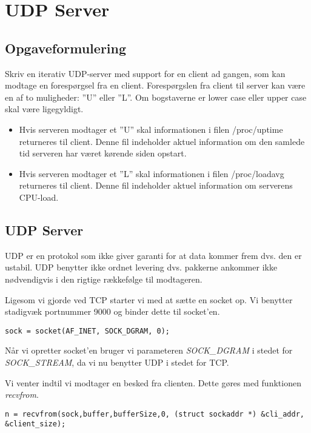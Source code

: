 \chapter{UDP Server}

\section{Opgaveformulering}

Skriv en iterativ UDP-server med support for en client ad gangen, som kan modtage en forespørgsel fra en client.
Forespørgslen fra client til server kan være en af to muligheder: ”U” eller ”L”. Om bogstaverne er lower case eller upper case skal være ligegyldigt.
\begin{itemize}
	\item Hvis serveren modtager et ”U” skal informationen i filen /proc/uptime
	returneres til client. Denne fil indeholder aktuel information om den samlede
	tid serveren har været kørende siden opstart.\\
	
	\item Hvis serveren modtager et ”L” skal informationen i filen /proc/loadavg
	returneres til client. Denne fil indeholder aktuel information om serverens
	CPU-load.
\end{itemize}

\section{UDP Server}
 
UDP er en protokol som ikke giver garanti for at data kommer frem dvs. den er ustabil. UDP benytter ikke ordnet levering dvs. pakkerne ankommer ikke nødvendigvis i den rigtige rækkefølge til modtageren. 

Ligesom vi gjorde ved TCP starter vi med at sætte en socket op. Vi benytter stadigvæk portnummer 9000 og binder dette til socket'en. 

\begin{lstlisting}
sock = socket(AF_INET, SOCK_DGRAM, 0);
\end{lstlisting}

Når vi opretter socket'en bruger vi parameteren \textit{SOCK\_DGRAM} i stedet for \textit{SOCK\_STREAM}, da vi nu benytter UDP i stedet for TCP. 

Vi venter indtil vi modtager en besked fra clienten. Dette gøres med funktionen \textit{recvfrom}.

\begin{lstlisting}
n = recvfrom(sock,buffer,bufferSize,0, (struct sockaddr *) &cli_addr, &client_size);
\end{lstlisting}


